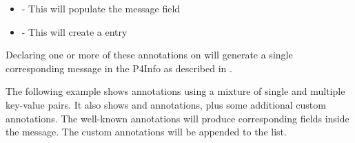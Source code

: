 \documentclass[11pt]{article}
\begin{document}
{\begin{itemize}
\item{}
 - This will populate the  message
field%

\item{}
 - This will create a  entry%
\end{itemize}%

\noindent{}Declaring one or more of these annotations on  will
generate a single corresponding  message in the P4Info as described in
.%

The following example shows  annotations using a mixture of single and
multiple key-value pairs. It also shows  and  annotations,
plus some additional custom annotations. The well-known annotations will produce
corresponding fields inside the  message. The custom annotations will
be appended to the  list.%

}
\end{document}

